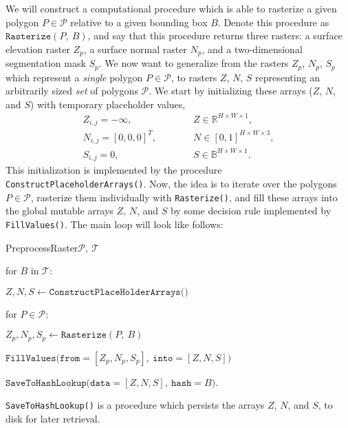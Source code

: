 We will construct a computational procedure which is able to rasterize a given polygon $P \in \mathcal{P}$ relative to a given bounding box $B$.
Denote this procedure as $\texttt{Rasterize}(P,~B)$, and say that this procedure returns three rasters: a surface elevation raster $Z_p$, a surface normal raster $N_p$, and a two-dimensional segmentation mask $S_p$.
We now want to generalize from the rasters $Z_p$, $N_p$, $S_p$ which represent a \textit{single} polygon $P \in \mathcal{P}$, to rasters $Z$, $N$, $S$ representing an arbitrarily sized \emph{set} of polygons $\mathcal{P}$.
We start by initializing these arrays ($Z$, $N$, and $S$) with temporary placeholder values,
\begin{align*}
  Z_{i,j} = -\infty, \hspace{3em} &Z \in \mathbb{R}^{H \times W \times 1}, \\
  N_{i,j} = {[0, 0, 0]}^T, \hspace{3em} &N \in [0, 1]^{H \times W \times 3}, \\
  S_{i,j} = 0, \hspace{3em} &S \in \mathbb{B}^{H \times W \times 1}.
\end{align*}
This initialization is implemented by the procedure \texttt{ConstructPlaceholderArrays()}.
Now, the idea is to iterate over the polygons $P \in \mathcal{P}$, rasterize them individually with \texttt{Rasterize()}, and fill these arrays into the global mutable arrays $Z$, $N$, and $S$ by some decision rule implemented by \texttt{FillValues()}.
The main loop will look like follows:
\begin{pseudofunc}{PreprocessRaster}{$\mathcal{P},~\mathcal{T}$}
  \item for $B$ in $\mathcal{T}$:
  \begin{pseudoloop}
    \item $Z, N, S \leftarrow \texttt{ConstructPlaceHolderArrays()}$
    \item for $P \in \mathcal{P}$:
    \begin{pseudoloop}
      \item $Z_p, N_p, S_p \leftarrow \texttt{Rasterize}(P,~B)$
      \item $\texttt{FillValues(from}=[Z_p, N_p, S_p],~\texttt{into}=[Z, N, S])$
    \end{pseudoloop}
    \item $\texttt{SaveToHashLookup(data}=[Z, N, S],~\texttt{hash}=B)$.
  \end{pseudoloop}
\end{pseudofunc}
\texttt{SaveToHashLookup()} is a procedure which persists the arrays $Z$, $N$, and $S$, to disk for later retrieval.
